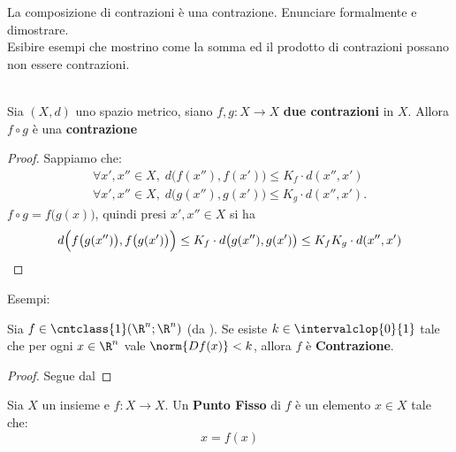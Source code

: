 \begin{exercise}
	La composizione di contrazioni è una contrazione. Enunciare formalmente e dimostrare.\\
	Esibire esempi che mostrino come la somma ed il prodotto di contrazioni possano non essere contrazioni.
	\begin{solution}\hfill\\
		Sia $(X, d)$ uno spazio metrico, siano $f,g:X \to X$ \textbf{due contrazioni} in $X$. Allora $f\circ g$ è una \textbf{contrazione}
		\begin{proof}
			\renewcommand\qedsymbol{$\square$}
			Sappiamo che:
			\begin{equation*}
				\begin{gathered}
					\forall x',x'' \in X,\; d \bigl( f(x''), f(x') \bigr) \leq K_f \cdot d(x'', x')\\
					\forall x',x'' \in X,\; d \bigl( g(x''), g(x') \bigr) \leq K_g \cdot d(x'', x').
				\end{gathered}
			\end{equation*}
			$f \circ g=f\bigl( g(x) \bigr)$, quindi presi $x',x''\in X$ si ha
			\[d \Bigl( f\bigl(g(x'')\bigr), f\bigl(g(x')\bigr) \Bigr) \leq K_f \cdot d \bigl( g(x''), g(x') \bigr) \leq K_f K_g \cdot d(x'',x')\]
		\end{proof}
		\noindent Esempi: %
	\end{solution}
\end{exercise}

\begin{proposition}
	\label{prop:se_Df_leq_k_allora_f_contr}
	Sia $f \in \cntclass{1}(\R^n;\R^n)$ (da ). Se esiste $k \in \intervalclop{0}{1}$ tale che per ogni $x \in \R^n$ vale $\norm{Df(x)} < k$, allora $f$ è \textbf{Contrazione}.
	\begin{proof}
		Segue dal 
	\end{proof}
\end{proposition}

\begin{definition}
	\label{def:punto_fisso}
	Sia $X$ un insieme e $f: X \to X$. Un \textbf{Punto Fisso} di $f$ è un elemento $x \in X$ tale che:
	\[x=f(x)\]
\end{definition}

